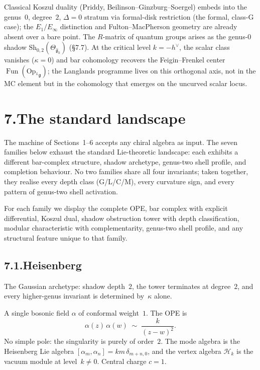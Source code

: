 \documentclass[11pt]{report}
\theoremstyle{definition}
\theoremstyle{remark}
\providecommand{\fg}{\mathfrak{g}}
\numberwithin{equation}{section}
\begin{document}
Classical Koszul duality (Priddy, Beilinson--Ginzburg--Soergel)
embeds into the genus~$0$, degree~$2$, $\Delta = 0$ stratum via
formal-disk restriction (the formal, class-G case); the
$E_1/E_\infty$ distinction and Fulton--MacPherson geometry are
already absent over a bare point. The $R$-matrix of quantum groups arises as the genus-$0$
shadow
$\mathrm{Sh}_{0,2}(\Theta_{\widehat{\fg}_k})$ (\S7.7).
At the critical level $k = -h^\vee$, the scalar class vanishes
($\kappa = 0$) and bar cohomology recovers the Feigin--Frenkel
center $\operatorname{Fun}(\mathrm{Op}_{{}^L\fg})$; the Langlands
programme lives on this orthogonal axis, not in the MC element
but in the cohomology that emerges on the uncurved scalar locus.

\section*{7.\quad The standard landscape}

The machine of Sections~1--6 accepts any chiral algebra as input.
The seven families
below exhaust the standard Lie-theoretic landscape: each exhibits a
different bar-complex structure, shadow archetype,
genus-two shell profile, and completion
behaviour. No two families share all four invariants; taken
together, they realise every depth class (G/L/C/M), every curvature
sign, and every pattern of genus-two shell activation.

For each family we display the complete OPE,
bar complex with explicit differential, Koszul dual,
shadow obstruction tower with depth classification, modular characteristic
with complementarity, genus-two shell profile, and any structural
feature unique to that family.


\subsection*{7.1.\quad Heisenberg}

The Gaussian archetype: shadow depth~$2$,
the tower terminates at degree~$2$, and every higher-genus invariant is
determined by~$\kappa$ alone.

A single bosonic field $\alpha$ of conformal weight~$1$. The OPE is
\[
\alpha(z)\,\alpha(w)
\;\sim\;
\frac{k}{(z-w)^2}.
\]
No simple pole: the singularity is purely of order~$2$. The mode
algebra is the Heisenberg Lie algebra
$[\alpha_m,\alpha_n]=km\,\delta_{m+n,0}$, and the vertex algebra
$\mathcal H_k$ is the vacuum module at level~$k\neq 0$. Central
charge $c=1$.
\end{document}
